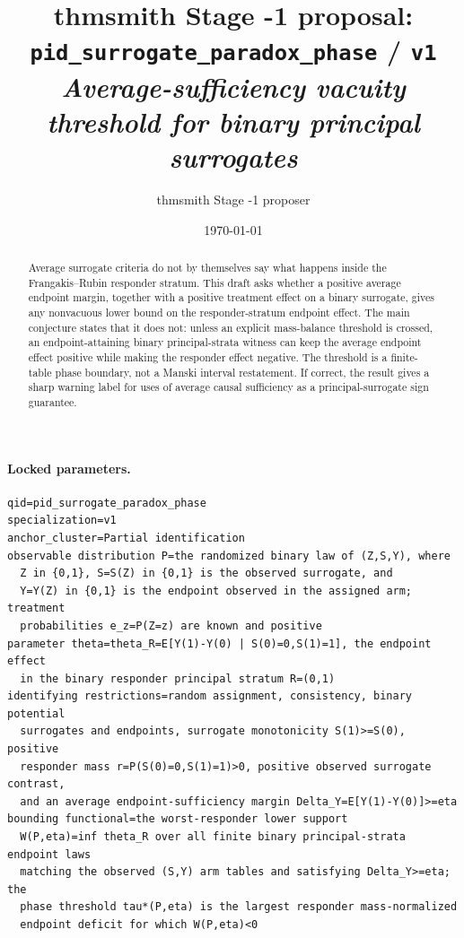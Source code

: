 \documentclass[11pt]{article}
\title{thmsmith Stage -1 proposal: \texttt{pid\_surrogate\_paradox\_phase} / \texttt{v1}%
  \\ \large\textit{Average-sufficiency vacuity threshold for binary principal surrogates}}
\author{thmsmith Stage -1 proposer}
\date{\today}
\theoremstyle{definition}
\theoremstyle{plain}
\theoremstyle{remark}
\begin{document}
\maketitle


\paragraph{Locked parameters.}
\begin{verbatim}
qid=pid_surrogate_paradox_phase
specialization=v1
anchor_cluster=Partial identification
observable distribution P=the randomized binary law of (Z,S,Y), where
  Z in {0,1}, S=S(Z) in {0,1} is the observed surrogate, and
  Y=Y(Z) in {0,1} is the endpoint observed in the assigned arm; treatment
  probabilities e_z=P(Z=z) are known and positive
parameter theta=theta_R=E[Y(1)-Y(0) | S(0)=0,S(1)=1], the endpoint effect
  in the binary responder principal stratum R=(0,1)
identifying restrictions=random assignment, consistency, binary potential
  surrogates and endpoints, surrogate monotonicity S(1)>=S(0), positive
  responder mass r=P(S(0)=0,S(1)=1)>0, positive observed surrogate contrast,
  and an average endpoint-sufficiency margin Delta_Y=E[Y(1)-Y(0)]>=eta
bounding functional=the worst-responder lower support
  W(P,eta)=inf theta_R over all finite binary principal-strata endpoint laws
  matching the observed (S,Y) arm tables and satisfying Delta_Y>=eta; the
  phase threshold tau*(P,eta) is the largest responder mass-normalized
  endpoint deficit for which W(P,eta)<0
\end{verbatim}

\begin{abstract}
Average surrogate criteria do not by themselves say what happens inside the Frangakis--Rubin responder stratum.
This draft asks whether a positive average endpoint margin, together with a positive treatment effect on a binary surrogate, gives any nonvacuous lower bound on the responder-stratum endpoint effect.
The main conjecture states that it does not: unless an explicit mass-balance threshold is crossed, an endpoint-attaining binary principal-strata witness can keep the average endpoint effect positive while making the responder effect negative.
The threshold is a finite-table phase boundary, not a Manski interval restatement.
If correct, the result gives a sharp warning label for uses of average causal sufficiency as a principal-surrogate sign guarantee.
\end{abstract}
\end{document}
